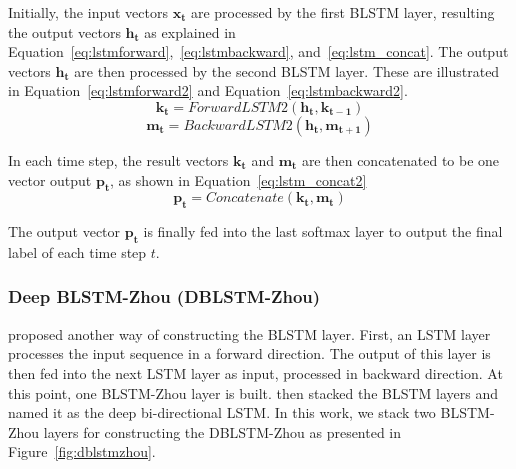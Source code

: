 Initially, the input vectors $\mathbf{x_{t}}$ are processed by the first BLSTM layer, resulting the output vectors $\mathbf{h_{t}}$ as explained in Equation~\ref{eq:lstmforward},~\ref{eq:lstmbackward}, and~\ref{eq:lstm_concat}. The output vectors $\mathbf{h_{t}}$ are then processed by the second BLSTM layer. These are illustrated in Equation~\ref{eq:lstmforward2} and Equation~\ref{eq:lstmbackward2}.
\begin{equation}
\label{eq:lstmforward2}
\mathbf{k_{t}} = ForwardLSTM2(\mathbf{h_{t}}, \mathbf{k_{t-1}})
\end{equation}
\begin{equation}
\label{eq:lstmbackward2}
\mathbf{m_{t}} = BackwardLSTM2(\mathbf{h_{t}}, \mathbf{m_{t+1}})
\end{equation}

In each time step, the result vectors $\mathbf{k_{t}}$ and $\mathbf{m_{t}}$ are then concatenated to be one vector output $\mathbf{p_{t}}$, as shown in Equation~\ref{eq:lstm_concat2}
\begin{equation}
\label{eq:lstm_concat2}
\mathbf{p_{t}} = Concatenate(\mathbf{k_{t}}, \mathbf{m_{t}})
\end{equation}

The output vector $\mathbf{p_{t}}$ is finally fed into the last softmax layer to output the final label of each time step $t$.

\subsubsection{Deep BLSTM-Zhou (DBLSTM-Zhou)}
\cite{zhou2015end} proposed another way of constructing the BLSTM layer. First, an LSTM layer processes the input sequence in a forward direction. The output of this layer is then fed into the next LSTM layer as input, processed in backward direction. At this point, one BLSTM-Zhou layer is built. \cite{zhou2015end} then stacked the BLSTM layers and named it as the deep bi-directional LSTM. In this work, we stack two BLSTM-Zhou layers for constructing the DBLSTM-Zhou as presented in Figure~\ref{fig:dblstmzhou}.


